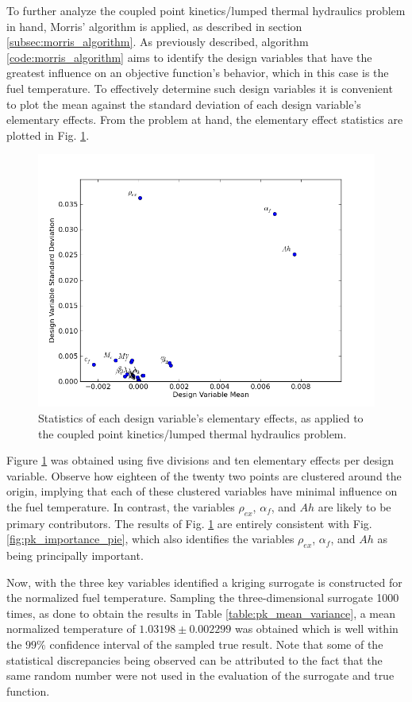 To further analyze the coupled point kinetics/lumped thermal hydraulics problem in hand, Morris' algorithm is applied, as described in section \ref{subsec:morris_algorithm}. As previously described, algorithm \ref{code:morris_algorithm} aims to identify the design variables that have the greatest influence on an objective function's behavior, which in this case is the fuel temperature. To effectively determine such design variables it is convenient to plot the mean against the standard deviation of each design variable's elementary effects. From the problem at hand, the elementary effect statistics are plotted in Fig. \ref{fig:kth_important_vars}.     
\begin{figure}[!htb]
\caption{\label{fig:kth_important_vars}
Statistics of each design variable's elementary effects, as applied to the coupled point kinetics/lumped thermal hydraulics problem.   
}
 \begin{center}
  \includegraphics[scale=.75]{./Chapter3/importantvariables.png}
 \end{center}
\end{figure}
Figure \ref{fig:kth_important_vars} was obtained using five divisions and ten elementary effects per design variable. Observe how eighteen of the twenty two points are clustered around the origin, implying that each of these clustered variables have minimal influence on the fuel temperature. In contrast, the variables $\rho_{ex}$, $\alpha_f$, and $Ah$ are likely to be primary contributors. The results of Fig. \ref{fig:kth_important_vars} are entirely consistent with Fig. \ref{fig:pk_importance_pie}, which also identifies the variables $\rho_{ex}$, $\alpha_f$, and $Ah$ as being principally important.      

Now, with the three key variables identified a kriging surrogate is constructed for the normalized fuel temperature. Sampling the three-dimensional surrogate 1000 times, as done to obtain the results in Table \ref{table:pk_mean_variance}, a mean normalized temperature of $1.03198 \pm 0.002299$ was obtained which is well within the $99\%$ confidence interval of the sampled true result. Note that some of the statistical discrepancies being observed can be attributed to the fact that the same random number were not used in the evaluation of the surrogate and true function. 
